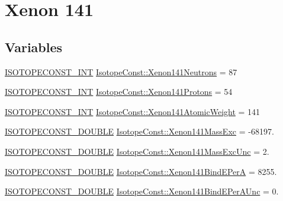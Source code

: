 \hypertarget{group___isotope_const-_xenon-_xe141}{}\section{Xenon 141}
\label{group___isotope_const-_xenon-_xe141}
\subsection*{Variables}
\begin{DoxyCompactItemize}
\item 
\mbox{\hyperlink{group___isotope_const-_macros_ga5f18360b3e99483a35c32d789e62621c}{I\+S\+O\+T\+O\+P\+E\+C\+O\+N\+S\+T\+\_\+\+I\+NT}} \mbox{\hyperlink{group___isotope_const-_xenon-_xe141_gafd922eaf5218aaef4460de27717375a7}{Isotope\+Const\+::\+Xenon141\+Neutrons}} = 87
\item 
\mbox{\hyperlink{group___isotope_const-_macros_ga5f18360b3e99483a35c32d789e62621c}{I\+S\+O\+T\+O\+P\+E\+C\+O\+N\+S\+T\+\_\+\+I\+NT}} \mbox{\hyperlink{group___isotope_const-_xenon-_xe141_gac4a51ce47cf10a08811e15eefdd35747}{Isotope\+Const\+::\+Xenon141\+Protons}} = 54
\item 
\mbox{\hyperlink{group___isotope_const-_macros_ga5f18360b3e99483a35c32d789e62621c}{I\+S\+O\+T\+O\+P\+E\+C\+O\+N\+S\+T\+\_\+\+I\+NT}} \mbox{\hyperlink{group___isotope_const-_xenon-_xe141_gaa863bd74da78517e4ddb2b220069703d}{Isotope\+Const\+::\+Xenon141\+Atomic\+Weight}} = 141
\item 
\mbox{\hyperlink{group___isotope_const-_macros_ga8f45a7272ce02c0b4c65c44636ed719a}{I\+S\+O\+T\+O\+P\+E\+C\+O\+N\+S\+T\+\_\+\+D\+O\+U\+B\+LE}} \mbox{\hyperlink{group___isotope_const-_xenon-_xe141_gaea799a176ed0c991cf1884f813ae9974}{Isotope\+Const\+::\+Xenon141\+Mass\+Exc}} = -\/68197.
\item 
\mbox{\hyperlink{group___isotope_const-_macros_ga8f45a7272ce02c0b4c65c44636ed719a}{I\+S\+O\+T\+O\+P\+E\+C\+O\+N\+S\+T\+\_\+\+D\+O\+U\+B\+LE}} \mbox{\hyperlink{group___isotope_const-_xenon-_xe141_gaf9de3b0c0b1c4a9070eb8d03626bd6a5}{Isotope\+Const\+::\+Xenon141\+Mass\+Exc\+Unc}} = 2.
\item 
\mbox{\hyperlink{group___isotope_const-_macros_ga8f45a7272ce02c0b4c65c44636ed719a}{I\+S\+O\+T\+O\+P\+E\+C\+O\+N\+S\+T\+\_\+\+D\+O\+U\+B\+LE}} \mbox{\hyperlink{group___isotope_const-_xenon-_xe141_gadedb22984264db895e224a1be4ebf795}{Isotope\+Const\+::\+Xenon141\+Bind\+E\+PerA}} = 8255.
\item 
\mbox{\hyperlink{group___isotope_const-_macros_ga8f45a7272ce02c0b4c65c44636ed719a}{I\+S\+O\+T\+O\+P\+E\+C\+O\+N\+S\+T\+\_\+\+D\+O\+U\+B\+LE}} \mbox{\hyperlink{group___isotope_const-_xenon-_xe141_gac02cbce30a336a67077c3444caf95992}{Isotope\+Const\+::\+Xenon141\+Bind\+E\+Per\+A\+Unc}} = 0.

\end{DoxyCompactItemize}
